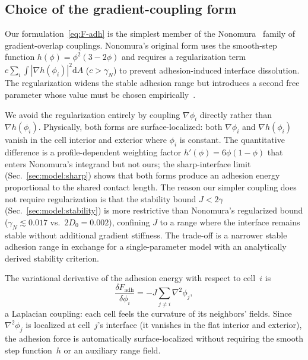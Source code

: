 \documentclass[aps,pre,twocolumn,superscriptaddress,longbibliography,floatfix]{revtex4-2}
\newcommand{\dd}{\mathrm{d}}               %
\newcommand{\phii}{\phi_i}                 %
\newcommand{\phij}{\phi_j}                 %
\begin{document}
\subsection{Choice of the gradient-coupling form}
\label{sec:model:choice}

Our formulation~\eqref{eq:F-adh} is the simplest member of the
Nonomura~\cite{Nonomura2012} family of gradient-overlap couplings.
Nonomura's original form uses the smooth-step function
$h(\phi) = \phi^2(3-2\phi)$ and requires a regularization term
$c\sum_i\!\int\!|\nabla h(\phii)|^2\dd A$ ($c > \gamma_N$)
to prevent adhesion-induced interface dissolution.  The
regularization widens the stable adhesion range but introduces a
second free parameter whose value must be chosen
empirically~\cite{Nonomura2012}.

We avoid the regularization entirely by coupling
$\nabla\phii$ directly rather than $\nabla h(\phii)$.
Physically, both forms are surface-localized:
both $\nabla\phii$ and $\nabla h(\phii)$ vanish in the cell
interior and exterior where $\phii$ is constant.  The quantitative
difference is a profile-dependent weighting factor
$h'(\phi) = 6\phi(1-\phi)$ that enters Nonomura's integrand
but not ours; the sharp-interface limit
(Sec.~\ref{sec:model:sharp}) shows that both forms produce an
adhesion energy proportional to the shared contact length.
The reason our simpler coupling does not require regularization
is that the stability bound $J < 2\gamma$
(Sec.~\ref{sec:model:stability}) is more restrictive than
Nonomura's regularized bound ($\gamma_N \lesssim 0.017$ vs.\
$2D_0 = 0.002$), confining $J$ to a range where the
interface remains stable without additional gradient stiffness.
The trade-off is a narrower stable adhesion range in
exchange for a single-parameter model with an analytically
derived stability criterion.

The variational derivative of the adhesion energy with respect to
cell~$i$ is
%
\begin{equation}
  \frac{\delta F_{\mathrm{adh}}}{\delta \phii}
    = -J \sum_{j \neq i} \nabla^2 \phij,
  \label{eq:adhesion-var}
\end{equation}
%
a Laplacian coupling: each cell feels the curvature of its neighbors'
fields.  Since $\nabla^2\phij$ is localized at cell~$j$'s interface (it
vanishes in the flat interior and exterior), the adhesion force is
automatically surface-localized without requiring the smooth step
function~$h$ or an auxiliary range field.
\end{document}

